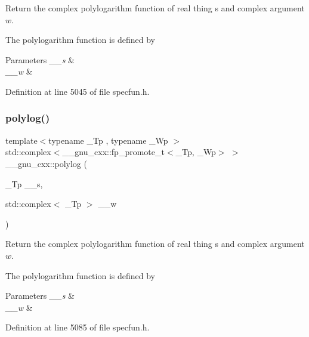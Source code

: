 Return the complex polylogarithm function of real thing {\ttfamily s} and complex argument $ w $.

The polylogarithm function is defined by \[ \]


\begin{DoxyParams}{Parameters}
{\em \+\_\+\+\_\+s} & \\
\hline
{\em \+\_\+\+\_\+w} & \\
\hline
\end{DoxyParams}


Definition at line 5045 of file specfun.\+h.

\mbox{\label{group__gnu__math__spec__func_ga817a208972a0200b667c68d199176d70}} 
\subsubsection{\texorpdfstring{polylog()}{polylog()}\hspace{0.1cm}{\footnotesize\ttfamily [2/2]}}
{\footnotesize\ttfamily template$<$typename \+\_\+\+Tp , typename \+\_\+\+Wp $>$ \\
std\+::complex$<$\+\_\+\+\_\+gnu\+\_\+cxx\+::fp\+\_\+promote\+\_\+t$<$\+\_\+\+Tp, \+\_\+\+Wp$>$ $>$ \+\_\+\+\_\+gnu\+\_\+cxx\+::polylog (\begin{DoxyParamCaption}\item[{\+\_\+\+Tp}]{\+\_\+\+\_\+s,  }\item[{std\+::complex$<$ \+\_\+\+Tp $>$}]{\+\_\+\+\_\+w }\end{DoxyParamCaption})\hspace{0.3cm}{\ttfamily [inline]}}

Return the complex polylogarithm function of real thing {\ttfamily s} and complex argument $ w $.

The polylogarithm function is defined by \[ \]


\begin{DoxyParams}{Parameters}
{\em \+\_\+\+\_\+s} & \\
\hline
{\em \+\_\+\+\_\+w} & \\
\hline
\end{DoxyParams}


Definition at line 5085 of file specfun.\+h.

